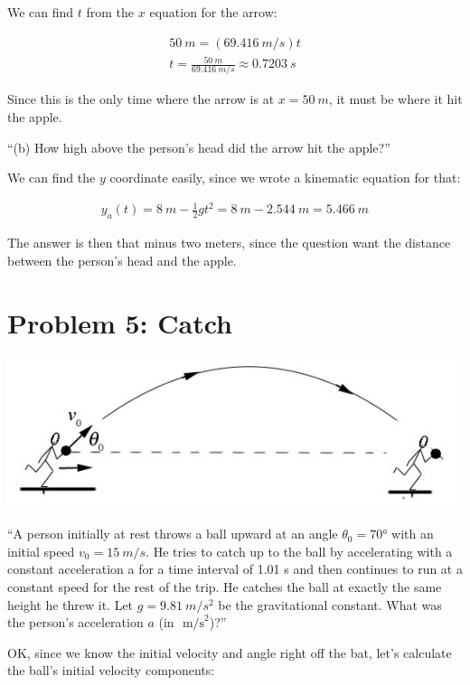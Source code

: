 \documentclass[8.01x]{subfiles}
\begin{document}
We can find $t$ from the $x$ equation for the arrow:

\begin{align}
\SI{50}{m} = (\SI{69.416}{m/s}) t\\
t = \frac{\SI{50}{m}}{\SI{69.416}{m/s}} \approx \SI{0.7203}{s}
\end{align}

Since this is the only time where the arrow is at $x = \SI{50}{m}$, it must be where it hit the apple.

``(b) How high above the person's head did the arrow hit the apple?''

We can find the $y$ coordinate easily, since we wrote a kinematic equation for that:

\begin{align}
y_a(t) = \SI{8}{m} - \frac{1}{2} g t^2 = \SI{8}{m} - \SI{2.544}{m} = \SI{5.466}{m}
\end{align}

The answer is then that minus two meters, since the question want the distance between the person's head and the apple.

\section{Problem 5: Catch}

\begin{center}
\includegraphics[scale=0.6]{Graphics/h2p5}
\end{center}

``A person initially at rest throws a ball upward at an angle $\theta_0 = \ang{70}$ with an initial speed $v_0 = \SI{15}{m/s}$. He tries to catch up to the ball by accelerating with a constant acceleration a for a time interval of 1.01 s and then continues to run at a constant speed for the rest of the trip. He catches the ball at exactly the same height he threw it. Let $g = \SI{9.81}{m/s^2}$ be the gravitational constant. What was the person's acceleration $a$ (in $\text{ m/s}^2$)?''

OK, since we know the initial velocity and angle right off the bat, let's calculate the ball's initial velocity components:
\end{document}
